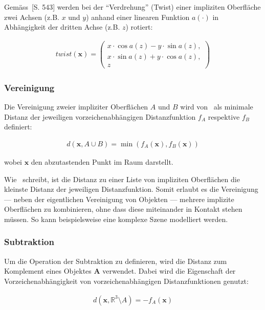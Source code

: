 Gemäss~\cite{hart_sphere_1994}[S. 543] werden bei der ``Verdrehung'' (Twist)
einer impliziten Oberfläche zwei Achsen (z.B. $x$ und $y$) anhand einer
linearen Funktion $a(\cdot)$ in Abhängigkeit der dritten Achse (z.B. $z$)
rotiert:

\begin{gather}
    twist(\bm{x}) = \begin{pmatrix} 
        x \cdot \cos{a(z)} - y \cdot \sin{a(z)},\\
        x \cdot \sin{a(z)} + y \cdot \cos{a(z)},\\
        z
    \end{pmatrix}
\end{gather}

\subsubsection{Vereinigung}
\label{ssubsec:implicit_surfaces_ops_union}

Die Vereinigung zweier impliziter Oberflächen $A$ und $B$ wird
von~\cite{hart_sphere_1994} als minimale Distanz der jeweiligen
vorzeichenabhängigen  Distanzfunktion $f_{A}$ respektive $f_{B}$ definiert:

\begin{gather}
    d(\bm{x}, A \cup B) = \min(f_{A}(\bm{x}), f_{B}(\bm{x}))
\end{gather}

wobei $\bm{x}$ den abzutastenden Punkt im Raum darstellt.

Wie~\citeauthor{hart_sphere_1994} schreibt, ist die Distanz zu einer Liste von
impliziten Oberflächen die kleinste Distanz der jeweiligen Distanzfunktion.
Somit erlaubt es die Vereinigung --- neben der eigentlichen Vereinigung von
Objekten --- mehrere implizite Oberflächen zu kombinieren, ohne dass diese
miteinander in Kontakt stehen müssen. So kann beispielsweise eine komplexe
Szene modelliert werden.

\subsubsection{Subtraktion}
\label{ssubsec:implicit_surfaces_ops_subtraction}

Um die Operation der Subtraktion zu definieren, wird die Distanz zum Komplement
eines Objektes $\bm{A}$ verwendet. Dabei wird die Eigenschaft der
Vorzeichenabhängigkeit von vorzeichenabhängigen Distanzfunktionen genutzt:

\begin{gather}
    d(\bm{x}, \mathbb{R}^{3} \setminus A) = -f_{A}(\bm{x})
\end{gather}

